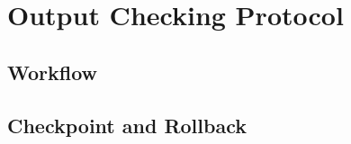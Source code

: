 \section{Output Checking Protocol} \label{sec:output}


\subsection{Workflow} \label{sec:output-workflow}







\subsection{Checkpoint and Rollback} \label{sec:checkpoint}








